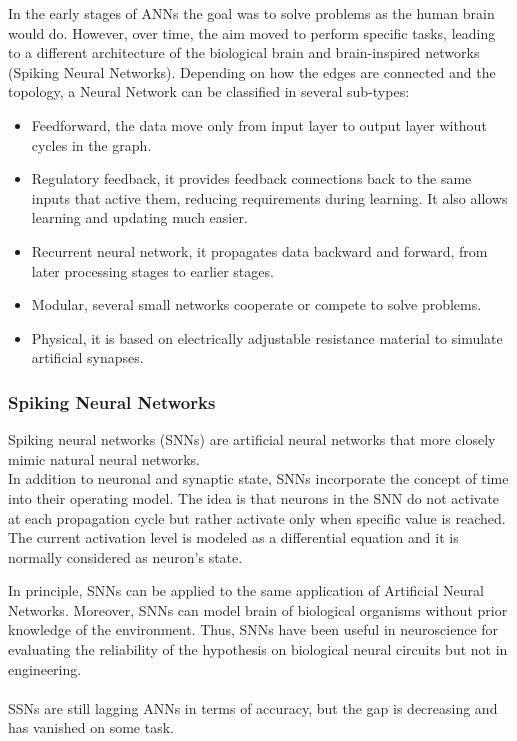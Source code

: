 In the early stages of ANNs the goal was to solve problems as the human brain would do. However, over time, the aim moved to perform specific tasks, leading to a different architecture of the biological brain and brain-inspired networks (Spiking Neural Networks).
\newpage
Depending on how the edges are connected and the topology, a Neural Network can be classified in several sub-types:
\begin{itemize}
\item Feedforward, the data move only from input layer to output layer without cycles in the graph.
\item Regulatory feedback, it provides feedback connections back to the same inputs that active them, reducing requirements during learning. It also allows learning and updating much easier.
\item Recurrent neural network, it propagates data backward and forward, from later processing stages to earlier stages.
\item Modular, several small networks cooperate or compete to solve problems.
\item Physical, it is based on electrically adjustable resistance material to simulate artificial synapses.
\end{itemize}

\subsubsection{Spiking Neural Networks}
Spiking neural networks (SNNs) are artificial neural networks that more closely mimic natural neural networks\cite{article:1}. \\In addition to neuronal and synaptic state, SNNs incorporate the concept of time into their operating model. The idea is that neurons in the SNN do not activate at each propagation cycle but rather activate only when specific value is reached.\\
The current activation level is modeled as a differential equation and it is normally considered as neuron's state.

In principle, SNNs can be applied to the same application of Artificial Neural Networks. Moreover, SNNs can model brain of biological organisms without prior knowledge of the environment. Thus, SNNs have been useful in neuroscience for evaluating the reliability of the hypothesis on biological neural circuits but not in engineering.\\\\
SSNs are still lagging ANNs in terms of accuracy, but the gap is decreasing and has vanished on some task\cite{article:2}.
\newpage
